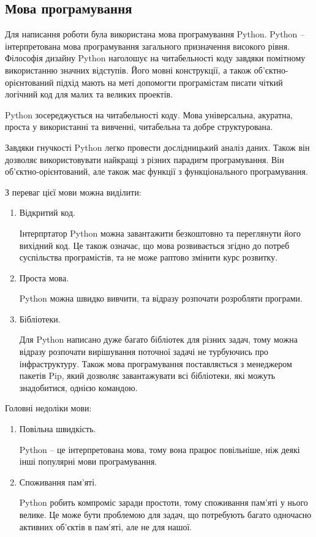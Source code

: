 \documentclass[a4paper,14pt]{extarticle}
\begin{document}
\subsection{Мова програмування}
Для написання роботи була використана мова програмування
Python. Python -- інтерпретована мова програмування загального
призначення високого рівня. Філософія дизайну Python наголошує
на читабельності коду завдяки помітному використанню значних
відступів. Його мовні конструкції, а також об’єктно-орієнтований
підхід мають на меті допомогти програмістам писати чіткий
логічний код для малих та великих проектів.

Python зосереджується на читабельності коду. Мова універсальна,
акуратна, проста у використанні та вивченні, читабельна
та добре структурована.

Завдяки гнучкості Python легко провести дослідницький аналіз даних.
Також він дозволяє використовувати найкращі з різних парадигм
програмування. Він об’єктно-орієнтований, але також має функції
з функціонального програмування.

З переваг цієї мови можна виділити:
\begin{enumerate}
    \item Відкритий код.

    Інтерпртатор Python можна завантажити безкоштовно та переглянути
    його вихідний код. Це також означає, що мова розвивається згідно
    до потреб суспільства програмістів, та не може раптово змінити
    курс розвитку.

    \item Проста мова.

    Python можна швидко вивчити, та відразу розпочати розробляти програми.

    \item Бібліотеки.

    Для Python написано дуже багато бібліотек для різних задач, тому
    можна відразу розпочати вирішування поточної задачі
    не турбуючись про інфраструктуру.
    Також мова програмування поставляється з менеджером пакетів Pip,
    який дозволяє завантажувати всі бібліотеки, які можуть
    знадобитися, однією командою.
\end{enumerate}

Головні недоліки мови:
\begin{enumerate}
    \item Повільна швидкість.

    Python -- це інтерпретована мова, тому вона працює повільніше,
    ніж деякі інші популярні мови програмування.

    \item Споживання пам'яті.

    Python робить компроміс заради простоти, тому споживання
    пам'яті у нього велике. Це може бути проблемою для задач, що
    потребують багато одночасно активних об'єктів в пам'яті,
    але не для нашої.
\end{enumerate}
\end{document}
